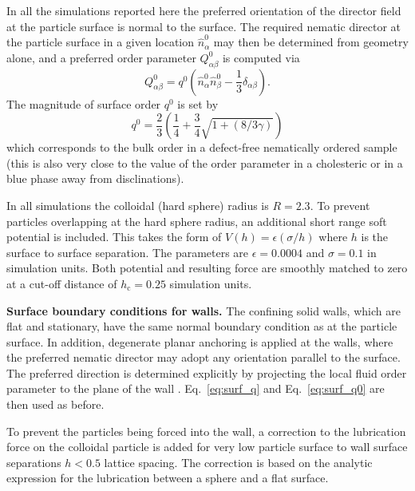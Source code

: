 \documentclass[12pt]{article}
\begin{document}
In all the simulations reported here the preferred orientation of the
director field at the particle surface is normal to the surface. The
required nematic director at the particle surface in a given location
$\hat{n}^0_\alpha$ may then be determined from geometry alone,
and a preferred order parameter $Q_{\alpha\beta}^0$ is computed via
\begin{equation}
Q^0_{\alpha\beta} = q^0(\hat{n}_\alpha^0 \hat{n}_\beta^0 
- {\textstyle \frac{1}{3}} \delta_{\alpha\beta}).
\label{eq:surf_q}
\end{equation}
The magnitude of surface order $q^0$ is set by
\begin{equation}
q^0 = {\textstyle \frac{2}{3}} \left( {\textstyle \frac{1}{4}} 
+ {\textstyle \frac{3}{4}} \sqrt{1 + (8/3\gamma)} \right)
\label{eq:surf_q0}
\end{equation}
which corresponds to the bulk order in a defect-free nematically ordered 
sample~\cite{denniston} (this is also very close to the value of the order 
parameter in a cholesteric or in a blue phase away from disclinations).

In all simulations the colloidal (hard sphere) radius is $R = 2.3$. To
prevent particles overlapping at the hard sphere radius, an additional
short range soft potential is included. This takes the form of
$V(h) = \epsilon (\sigma/h)$ where $h$ is the surface to surface separation.
The parameters are $\epsilon = 0.0004$ and $\sigma = 0.1$ in simulation
units. Both potential and resulting force are smoothly matched to zero at
a cut-off distance of $h_\mathrm{c} = 0.25$ simulation units.

\medskip
\noindent
\textbf{Surface boundary conditions for walls.}
The confining solid walls, which are flat and stationary, have the
same normal boundary condition as at the particle surface. In addition,
degenerate planar anchoring is applied at the walls, where the
preferred nematic director may adopt any orientation parallel
to the surface. The preferred direction is determined explicitly
by projecting the local fluid order parameter to the plane of the
wall \cite{fournier2005}. Eq.~\ref{eq:surf_q} and Eq.~\ref{eq:surf_q0}
are then used as before.

To prevent the particles being forced into the wall, a correction
to the lubrication force on the colloidal particle is added for very low
particle
surface to wall surface separations $h < 0.5$ lattice spacing. The
correction is based on the analytic expression for the lubrication
between a sphere and a flat surface.
\end{document}
